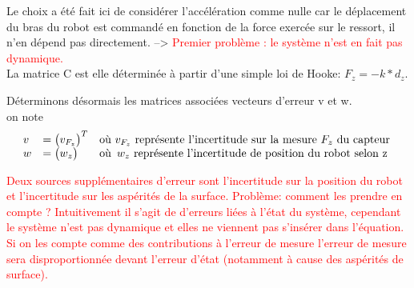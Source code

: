 \documentclass[12pt,twoside,a4paper]{article}
\begin{document}
Le choix a été fait ici de considérer l'accélération comme nulle car le déplacement du bras du robot est commandé en fonction de la force exercée sur le ressort, il n'en dépend pas directement. --> \textcolor{red}{Premier problème : le système n'est en fait pas dynamique.}
\\
La matrice C est elle déterminée à partir d'une simple loi de Hooke: $F_z = -k*d_z$. 

\vspace{2cm}

Déterminons désormais les  matrices associées vecteurs d'erreur v et w. \\
on note 
$$
\begin{array}{lll}
 v &= \begin{pmatrix}  v_{F_{z}}  \end{pmatrix} ^T  & \text{où $v_{F_{z}}$ représente l'incertitude sur la mesure $F_z$ du capteur} \\
 w &= \begin{pmatrix} w_z  \end{pmatrix}&
 		\text{où}
		\begin{array}[t]{l}
		\text{$w_z$ représente l'incertitude de position du robot selon z} \\
		\end{array} \\
 \end{array}
 $$
 
% 

\textcolor{red}{Deux sources supplémentaires d'erreur sont l'incertitude sur la position du robot et l'incertitude sur les aspérités de la surface. Problème: comment les prendre en compte ? Intuitivement il s'agit de d'erreurs liées à l'état du système, cependant le système n'est pas dynamique et elles ne viennent pas s'insérer dans l'équation. Si on les compte comme des contributions à l'erreur de mesure l'erreur de mesure sera disproportionnée devant l'erreur d'état (notamment à cause des aspérités de surface). }
 
\end{document}
